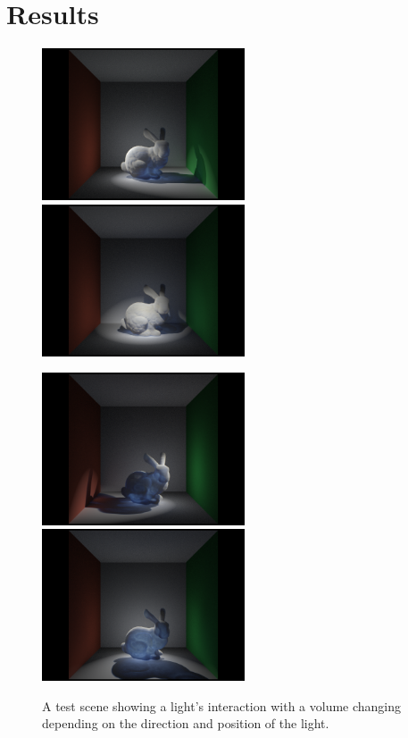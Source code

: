 \documentclass[12pt]{ucthesis}
\newcommand{\captionfonts}{\small\bf\ssp}
\begin{document}
\chapter{Results}

\begin{figure}[h!]
\centering
    \includegraphics[width=60mm]{img/bunny_spot/spot_left.png}
    \includegraphics[width=60mm]{img/bunny_spot/spot_front.png}

    \includegraphics[width=60mm]{img/bunny_spot/spot_right.png}
    \includegraphics[width=60mm]{img/bunny_spot/spot_behind.png}
    \captionfonts
    \caption{A test scene showing a light's interaction with a volume changing depending on the direction and position of the light.}
\end{figure}
\end{document}
